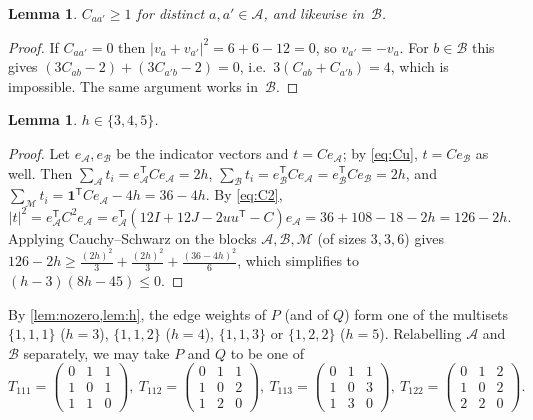 \documentclass[11pt,a4paper]{amsart}
\newtheorem{lemma}[theorem]{Lemma}
\theoremstyle{definition}
\theoremstyle{remark}
\newcommand{\one}{\mathbf{1}}
\newcommand{\cA}{\mathcal{A}}
\newcommand{\cB}{\mathcal{B}}
\newcommand{\cM}{\mathcal{M}}
\begin{document}
\begin{lemma}\label{lem:nozero}
$C_{aa'}\ge1$ for distinct $a,a'\in\cA$, and likewise in~$\cB$.
\end{lemma}

\begin{proof}
If $C_{aa'}=0$ then $|v_a+v_{a'}|^2=6+6-12=0$, so $v_{a'}=-v_a$. For $b\in\cB$ this gives
$(3C_{ab}-2)+(3C_{a'b}-2)=0$, i.e.\ $3(C_{ab}+C_{a'b})=4$, which is impossible. The same argument works
in~$\cB$.
\end{proof}

\begin{lemma}\label{lem:h}
$h\in\{3,4,5\}$.
\end{lemma}

\begin{proof}
Let $e_\cA,e_\cB$ be the indicator vectors and $t=Ce_\cA$; by \eqref{eq:Cu}, $t=Ce_\cB$ as well. Then
$\sum_{\cA}t_i=e_\cA^{\mathsf T}Ce_\cA=2h$, $\sum_{\cB}t_i=e_\cB^{\mathsf T}Ce_\cA=e_\cB^{\mathsf T}Ce_\cB=2h$,
and $\sum_{\cM}t_i=\one^{\mathsf T}Ce_\cA-4h=36-4h$. By \eqref{eq:C2},
\[
|t|^2=e_\cA^{\mathsf T}C^2e_\cA=e_\cA^{\mathsf T}(12I+12J-2uu^{\mathsf T}-C)e_\cA=36+108-18-2h=126-2h .
\]
Applying Cauchy--Schwarz on the blocks $\cA,\cB,\cM$ (of sizes $3,3,6$) gives
$126-2h\ge\tfrac{(2h)^2}{3}+\tfrac{(2h)^2}{3}+\tfrac{(36-4h)^2}{6}$, which simplifies to
$(h-3)(8h-45)\le0$.
\end{proof}

By \cref{lem:nozero,lem:h}, the edge weights of $P$ (and of $Q$) form one of the multisets
$\{1,1,1\}$ ($h=3$), $\{1,1,2\}$ ($h=4$), $\{1,1,3\}$ or $\{1,2,2\}$ ($h=5$). Relabelling $\cA$ and $\cB$
separately, we may take $P$ and $Q$ to be one of
\[
T_{111}=\begin{pmatrix}0&1&1\\1&0&1\\1&1&0\end{pmatrix},\
T_{112}=\begin{pmatrix}0&1&1\\1&0&2\\1&2&0\end{pmatrix},\
T_{113}=\begin{pmatrix}0&1&1\\1&0&3\\1&3&0\end{pmatrix},\
T_{122}=\begin{pmatrix}0&1&2\\1&0&2\\2&2&0\end{pmatrix}.
\]
\end{document}
